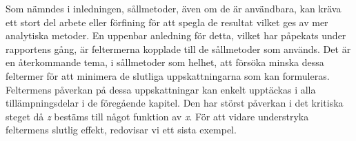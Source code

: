 

Som nämndes i inledningen, sållmetoder, även om de är användbara, kan kräva ett stort del arbete eller förfining för att spegla de resultat vilket ges av mer analytiska metoder. 
En uppenbar anledning för detta, vilket har påpekats under rapportens gång, är feltermerna kopplade till de sållmetoder som används. 
Det är en återkommande tema, i sållmetoder som helhet, att försöka minska dessa feltermer för att minimera de slutliga uppskattningarna som kan formuleras.
Feltermens påverkan på dessa uppskattningar kan enkelt upptäckas i alla tillämpningsdelar i de föregående kapitel.
Den har störst påverkan i det kritiska steget då \textit{z} bestäms till något funktion av \textit{x}.
För att vidare understryka feltermens slutlig effekt, redovisar vi ett sista exempel.

